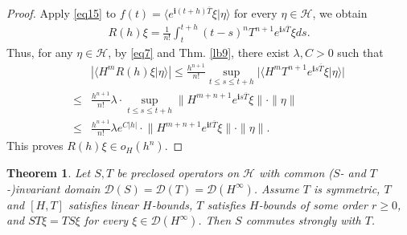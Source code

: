 \documentclass[12pt,a4paper,notitlepage]{article}
\theoremstyle{definition}
\theoremstyle{plain}
\newtheorem{thm}[df]{Theorem}
\newcommand{\mc}{\mathcal}
\newcommand{\ovl}{\overline}
\newcommand{\Dom}{\scr D}
\newcommand{\bk}[1]{\langle {#1}\rangle}
\newcommand{\scr}{\mathscr}
\newcommand{\im}{\mathbf{i}}
\numberwithin{equation}{subsection}
\begin{document}
\begin{proof}
Apply \eqref{eq15} to $f(t)=\bk{e^{\im(t+h)\ovl T}\xi|\eta}$ for every $\eta\in\mc H$, we obtain
\begin{align*}
R(h)\xi=\frac 1{n!}\int_t^{t+h}(t-s)^nT^{n+1}e^{\im s\ovl T}\xi ds.
\end{align*}
Thus, for any $\eta\in\mc H$, by \eqref{eq7} and Thm. \ref{lb9}, there exist $\lambda,C>0$ such that
\begin{align*}
&|\bk{H^mR(h)\xi|\eta}|\leq \frac {h^{n+1}}{n!}\sup_{t\leq s\leq t+h}\big|\bk{H^mT^{n+1}e^{\im s\ovl T}\xi|\eta}\big|\\
\leq&\frac {h^{n+1}}{n!}\lambda\cdot\sup_{t\leq s\leq t+h}\lVert H^{m+n+1}e^{\im s\ovl T}\xi\lVert\cdot\lVert\eta\lVert\\
	\leq&\frac {h^{n+1}}{n!}\lambda e^{C|h|}\cdot\lVert H^{m+n+1}e^{\im t\ovl T}\xi\lVert\cdot\lVert\eta\lVert.
\end{align*}
This proves $R(h)\xi\in o_H(h^n)$.
\end{proof}
	
	
	
	
	
\begin{thm}
Let $S,T$ be preclosed operators on $\mc H$ with common ($S$- and $T$-)invariant domain $\Dom(S)=\Dom(T)=\Dom(H^\infty)$. Assume $T$ is symmetric, $T$ and $[H,T]$ satisfies linear $H$-bounds,  $T$ satisfies $H$-bounds of some order $r\geq 0$, and $ST\xi=TS\xi$ for every $\xi\in\Dom(H^\infty)$. Then $S$ commutes strongly with $T$.
\end{thm}	
	
\end{document}
